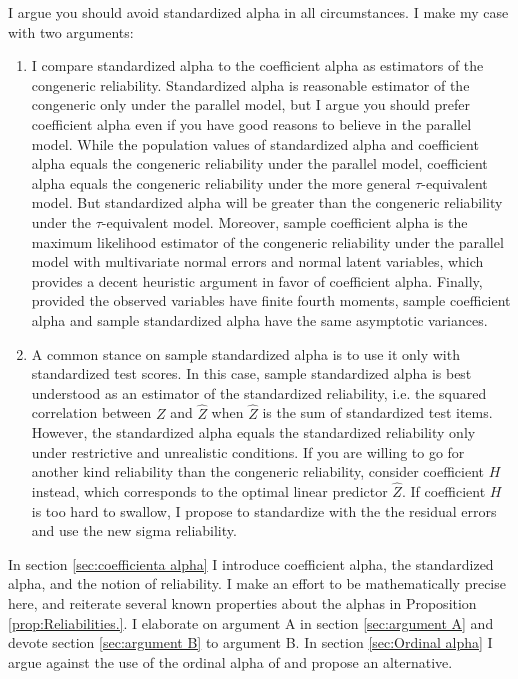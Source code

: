 \documentclass[twoside]{article}
\begin{document}
I argue you should avoid standardized alpha in all circumstances. I make my case with two arguments:

\begin{enumerate}[label=(\Alph*)]
\item I compare standardized alpha to the coefficient alpha as estimators of the congeneric reliability. Standardized alpha is reasonable estimator of the congeneric only under the parallel model, but I argue you should prefer coefficient alpha even if you have good reasons to believe in the parallel model. While the population values of standardized alpha and coefficient alpha equals the congeneric reliability under the parallel model, coefficient alpha equals the congeneric reliability under the more general $\tau$-equivalent model. But standardized alpha will be greater than the congeneric reliability under the $\tau$-equivalent model. Moreover, sample coefficient alpha is the maximum likelihood estimator of the congeneric reliability under the parallel model with multivariate normal errors and normal latent variables, which provides a decent heuristic argument in favor of coefficient alpha. Finally, provided the observed variables have finite fourth moments, sample coefficient alpha and sample standardized alpha have the same asymptotic variances. 

\item A common stance on sample standardized alpha is to use it only with standardized test scores. In this case, sample standardized alpha is best understood as an estimator of the standardized reliability, i.e. the squared correlation between $Z$ and $\hat{Z}$ when $\hat{Z}$ is the sum of standardized test items. However, the standardized alpha equals the standardized reliability only under restrictive and unrealistic conditions. If you are willing to go for another kind reliability than the congeneric reliability, consider coefficient $H$ instead, which corresponds to the optimal linear predictor $\hat{Z}$. If coefficient $H$ is too hard to swallow, I propose to standardize with the the residual errors and use the new sigma reliability.
\end{enumerate}

In section \ref{sec:coefficienta alpha} I introduce coefficient alpha, the standardized alpha, and the notion of reliability. I make an effort to be mathematically precise here, and reiterate several known properties about the alphas in Proposition \ref{prop:Reliabilities.}. I elaborate on argument A in section \ref{sec:argument A} and devote section \ref{sec:argument B} to argument B. In section \ref{sec:Ordinal alpha} I argue against the use of the ordinal alpha of  \citet{Zumbo2007-ap} and propose an alternative.
\end{document}

